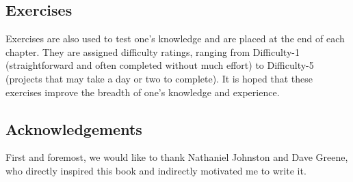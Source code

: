 \documentclass[
	11pt, %
	fleqn, %
	a4paper, %
]{LegrandOrangeBook}
\begin{document}
\subsection*{Exercises}
Exercises are also used to test one's knowledge and are placed at the end of each chapter. They are assigned difficulty ratings, ranging from Difficulty-1 (straightforward and often completed without much effort) to Difficulty-5 (projects that may take a day or two to complete). It is hoped that these exercises improve the breadth of one's knowledge and experience.
\subsection*{Acknowledgements}
First and foremost, we would like to thank Nathaniel Johnston and Dave Greene, who directly inspired this book and indirectly motivated me to write it. 
\end{document}
